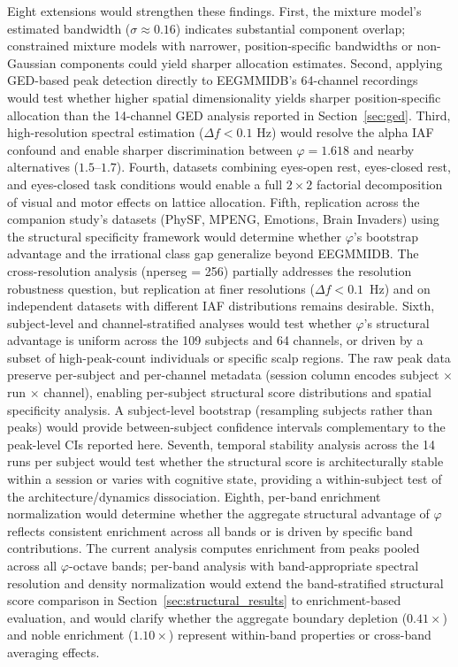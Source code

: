 \documentclass[11pt,a4paper]{article}
\newcommand{\phisym}{\varphi}
\begin{document}
Eight extensions would strengthen these findings. First, the mixture model's estimated bandwidth ($\sigma \approx 0.16$) indicates substantial component overlap; constrained mixture models with narrower, position-specific bandwidths or non-Gaussian components could yield sharper allocation estimates. Second, applying GED-based peak detection directly to EEGMMIDB's 64-channel recordings would test whether higher spatial dimensionality yields sharper position-specific allocation than the 14-channel GED analysis reported in Section~\ref{sec:ged}. Third, high-resolution spectral estimation ($\Delta f < 0.1$ Hz) would resolve the alpha IAF confound and enable sharper discrimination between $\phisym = 1.618$ and nearby alternatives ($1.5$--$1.7$). Fourth, datasets combining eyes-open rest, eyes-closed rest, and eyes-closed task conditions would enable a full $2 \times 2$ factorial decomposition of visual and motor effects on lattice allocation. Fifth, replication across the companion study's datasets (PhySF, MPENG, Emotions, Brain Invaders) using the structural specificity framework would determine whether $\phisym$'s bootstrap advantage and the irrational class gap generalize beyond EEGMMIDB. The cross-resolution analysis (nperseg = 256) partially addresses the resolution robustness question, but replication at finer resolutions ($\Delta f < 0.1$~Hz) and on independent datasets with different IAF distributions remains desirable. Sixth, subject-level and channel-stratified analyses would test whether $\phisym$'s structural advantage is uniform across the 109 subjects and 64 channels, or driven by a subset of high-peak-count individuals or specific scalp regions. The raw peak data preserve per-subject and per-channel metadata (session column encodes subject $\times$ run $\times$ channel), enabling per-subject structural score distributions and spatial specificity analysis. A subject-level bootstrap (resampling subjects rather than peaks) would provide between-subject confidence intervals complementary to the peak-level CIs reported here. Seventh, temporal stability analysis across the 14 runs per subject would test whether the structural score is architecturally stable within a session or varies with cognitive state, providing a within-subject test of the architecture/dynamics dissociation. Eighth, per-band enrichment normalization would determine whether the aggregate structural advantage of $\phisym$ reflects consistent enrichment across all bands or is driven by specific band contributions. The current analysis computes enrichment from peaks pooled across all $\phisym$-octave bands; per-band analysis with band-appropriate spectral resolution and density normalization would extend the band-stratified structural score comparison in Section~\ref{sec:structural_results} to enrichment-based evaluation, and would clarify whether the aggregate boundary depletion ($0.41\times$) and noble enrichment ($1.10\times$) represent within-band properties or cross-band averaging effects.
\end{document}

